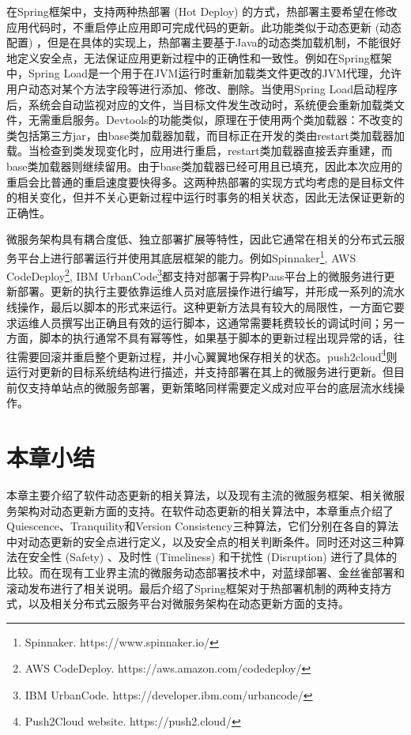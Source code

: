 \documentclass[macfonts,master]{njuthesis}
\begin{document}
在Spring框架\cite{johnson2004spring}中，支持两种热部署 (Hot Deploy) 的方式，热部署主要希望在修改应用代码时，不重启停止应用即可完成代码的更新。此功能类似于动态更新 (动态配置) ，但是在具体的实现上，热部署主要基于Java的动态类加载机制，不能很好地定义安全点，无法保证应用更新过程中的正确性和一致性。例如在Spring框架中，Spring Load是一个用于在JVM运行时重新加载类文件更改的JVM代理，允许用户动态对某个方法字段等进行添加、修改、删除。当使用Spring Load启动程序后，系统会自动监视对应的文件，当目标文件发生改动时，系统便会重新加载类文件，无需重启服务。Devtools的功能类似，原理在于使用两个类加载器：不改变的类包括第三方jar，由base类加载器加载，而目标正在开发的类由restart类加载器加载。当检查到类发现变化时，应用进行重启，restart类加载器直接丢弃重建，而base类加载器则继续留用。由于base类加载器已经可用且已填充，因此本次应用的重启会比普通的重启速度要快得多。这两种热部署的实现方式均考虑的是目标文件的相关变化，但并不关心更新过程中运行时事务的相关状态，因此无法保证更新的正确性。

微服务架构具有耦合度低、独立部署扩展等特性，因此它通常在相关的分布式云服务平台上进行部署运行并使用其底层框架的能力\cite{sampaio2017supporting}。例如Spinnaker\footnote{Spinnaker. https://www.spinnaker.io/}, AWS CodeDeploy\footnote{AWS CodeDeploy. https://aws.amazon.com/codedeploy/}, IBM UrbanCode\footnote{IBM UrbanCode. https://developer.ibm.com/urbancode/}都支持对部署于异构Paas平台上的微服务进行更新部署。更新的执行主要依靠运维人员对底层操作进行编写，并形成一系列的流水线操作，最后以脚本的形式来运行。这种更新方法具有较大的局限性，一方面它要求运维人员撰写出正确且有效的运行脚本，这通常需要耗费较长的调试时间；另一方面，脚本的执行通常不具有幂等性，如果基于脚本的更新过程出现异常的话，往往需要回滚并重启整个更新过程，并小心翼翼地保存相关的状态。push2cloud\footnote{Push2Cloud website. https://push2.cloud/}则运行对更新的目标系统结构进行描述，并支持部署在其上的微服务进行更新。但目前仅支持单站点的微服务部署，更新策略同样需要定义成对应平台的底层流水线操作。

\section{本章小结}
本章主要介绍了软件动态更新的相关算法，以及现有主流的微服务框架、相关微服务架构对动态更新方面的支持。在软件动态更新的相关算法中，本章重点介绍了Quiescence、Tranquility和Version Consistency三种算法，它们分别在各自的算法中对动态更新的安全点进行定义，以及安全点的相关判断条件。同时还对这三种算法在安全性 (Safety) 、及时性 (Timeliness) 和干扰性 (Disruption) 进行了具体的比较。而在现有工业界主流的微服务动态部署技术中，对蓝绿部署、金丝雀部署和滚动发布进行了相关说明。最后介绍了Spring框架对于热部署机制的两种支持方式，以及相关分布式云服务平台对微服务架构在动态更新方面的支持。
\end{document}

